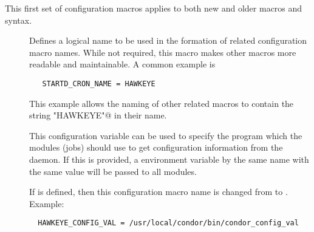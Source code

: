 This first set of configuration macros applies to both new
and older macros and syntax.
\begin{description}

\item[]
\label{param:StartdCronName}
  Defines a logical name to be used in the formation of related
  configuration macro names. While
  not required, this macro makes other macros
  more readable and maintainable.  A common example is
\begin{verbatim}
   STARTD_CRON_NAME = HAWKEYE
\end{verbatim}
  This example allows the naming of other related macros
  to contain the string \verb@"HAWKEYE"@ in their name.

\item[]
\label{param:StartdCronConfigVal}
  This configuration variable can be used to specify the
   program which the modules (jobs) should use to
  get configuration information from the daemon.  If this is provided,
  a environment variable by the same name with the same value will be
  passed to all modules.

  If 
  is defined, then this configuration macro name is changed from
   to
  .  Example:

\begin{verbatim}
  HAWKEYE_CONFIG_VAL = /usr/local/condor/bin/condor_config_val
\end{verbatim}


\end{description}
